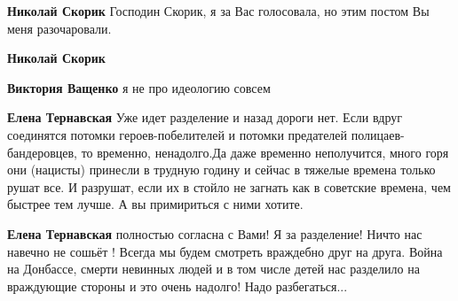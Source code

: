 \begin{itemize}
\begin{itemize}
 
\textbf{Николай Скорик} Господин Скорик, я за Вас голосовала, но этим постом Вы меня разочаровали.

 
\textbf{Николай Скорик}

 

\textbf{Виктория Ващенко} я не про идеологию совсем

 
\textbf{Елена Тернавская} Уже идет разделение и назад дороги нет. Если вдруг
соединятся потомки героев-побелителей и потомки предателей
полицаев-бандеровцев, то временно, ненадолго.Да даже временно неполучится,
много горя они (нацисты) принесли в трудную годину и сейчас в тяжелые времена
только рушат все. И разрушат, если их в стойло не загнать как в советские
времена, чем быстрее тем лучше. А вы примириться с ними хотите.

 
\textbf{Елена Тернавская} полностью согласна с Вами! Я за разделение! Ничто нас
навечно не сошьёт ! Всегда мы будем смотреть враждебно друг на друга. Война на
Донбассе, смерти невинных людей и в том числе детей нас разделило на враждующие
стороны и это очень надолго! Надо разбегаться...


\end{itemize}
\end{itemize}
